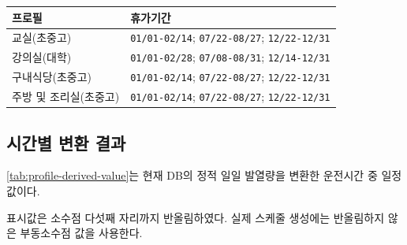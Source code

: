 \begin{defaulttable}
  \caption{내장 프로필 DB의 휴가기간}
  \label{tab:profile-db-vacations}
  {\small
  \begin{tabularx}{\textwidth}{p{5.0cm}X}
    \toprule
    프로필 & 휴가기간 \\ \midrule

    교실(초중고)
      & \texttt{01/01-02/14};
        \texttt{07/22-08/27};
        \texttt{12/22-12/31} \\

    강의실(대학)
      & \texttt{01/01-02/28};
        \texttt{07/08-08/31};
        \texttt{12/14-12/31} \\

    구내식당(초중고)
      & \texttt{01/01-02/14};
        \texttt{07/22-08/27};
        \texttt{12/22-12/31} \\

    주방 및 조리실(초중고)
      & \texttt{01/01-02/14};
        \texttt{07/22-08/27};
        \texttt{12/22-12/31} \\

    \bottomrule
  \end{tabularx}
  }
\end{defaulttable}

\subsection{시간별 변환 결과}

\cref{tab:profile-derived-value}는
현재 DB의 정적 일일 발열량을 변환한 운전시간 중 일정값이다.

표시값은 소수점 다섯째 자리까지 반올림하였다. 실제 스케줄 생성에는
반올림하지 않은 부동소수점 값을 사용한다.

